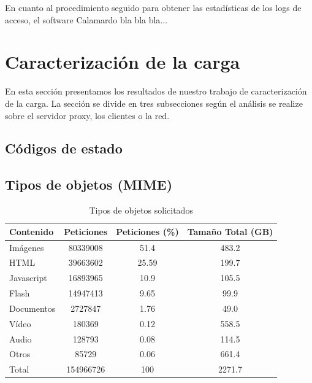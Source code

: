 \documentclass[twocolumn]{Jornadas}
\begin{document}
En cuanto al procedimiento seguido para obtener las estadísticas de los logs de acceso, el software Calamardo bla bla bla...


\section{Caracterización de la carga}
\label{resultados}

En esta sección presentamos los resultados de nuestro trabajo de caracterización de la carga. La sección se divide en tres subsecciones según el análisis se realize sobre el servidor proxy, los clientes o la red.

\subsection{Códigos de estado}

\subsection{Tipos de objetos (MIME)}
\label{mime}

\begin{table}[ht!]
\centering
\renewcommand{\baselinestretch}{1.5}
\scriptsize
\begin{tabular}{|l||c|c|c|} \hline
Contenido   & Peticiones & Peticiones (\%) &Tamaño Total (GB) \\\hline\hline
Imágenes    & 80339008   & 51.4 &483.2             \\\hline  
HTML        & 39663602   & 25.59 &199.7             \\\hline 
Javascript  & 16893965   & 10.9 &105.5             \\\hline 
Flash       & 14947413   & 9.65 & 99.9              \\\hline 
Documentos  & 2727847    & 1.76 &49.0              \\\hline
Vídeo       & 180369     & 0.12 & 558.5             \\\hline 
Audio       & 128793     & 0.08 & 114.5             \\\hline 
Otros       & 85729      & 0.06 & 661.4             \\\hline\hline
Total & 154966726 & 100 & 2271.7 \\\hline
\end{tabular}
\caption{Tipos de objetos solicitados}
\label{table:contenido}
\end{table}
\end{document}
